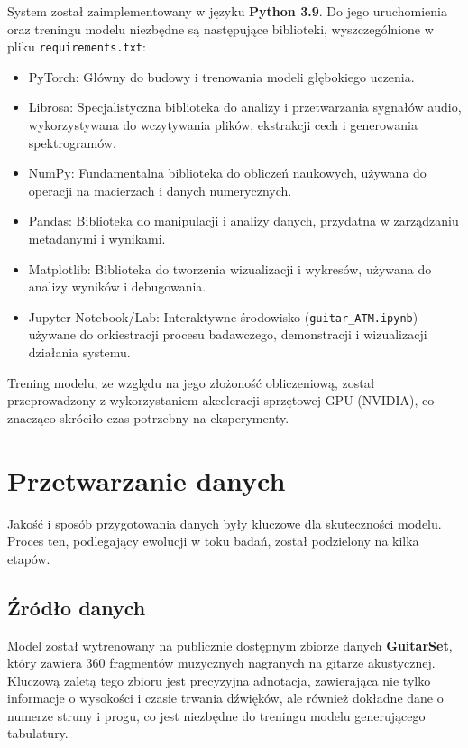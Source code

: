 System został zaimplementowany w języku \textbf{Python 3.9}. Do jego uruchomienia oraz treningu modelu niezbędne są następujące biblioteki, wyszczególnione w pliku \texttt{requirements.txt}:

\begin{itemize}
    \item PyTorch: Główny  do budowy i trenowania modeli głębokiego uczenia.
    \item Librosa: Specjalistyczna biblioteka do analizy i przetwarzania sygnałów audio, wykorzystywana do wczytywania plików, ekstrakcji cech i generowania spektrogramów.
    \item NumPy: Fundamentalna biblioteka do obliczeń naukowych, używana do operacji na macierzach i danych numerycznych.
    \item Pandas: Biblioteka do manipulacji i analizy danych, przydatna w zarządzaniu metadanymi i wynikami.
    \item Matplotlib: Biblioteka do tworzenia wizualizacji i wykresów, używana do analizy wyników i debugowania.
    \item Jupyter Notebook/Lab: Interaktywne środowisko (\texttt{guitar\_ATM.ipynb}) używane do orkiestracji procesu badawczego, demonstracji i wizualizacji działania systemu.
\end{itemize}

Trening modelu, ze względu na jego złożoność obliczeniową, został przeprowadzony z wykorzystaniem akceleracji sprzętowej GPU (NVIDIA), co znacząco skróciło czas potrzebny na eksperymenty.

\section*{Przetwarzanie danych}
\label{sec:tech_dane}

Jakość i sposób przygotowania danych były kluczowe dla skuteczności modelu. Proces ten, podlegający ewolucji w toku badań, został podzielony na kilka etapów.

\subsection*{Źródło danych}

Model został wytrenowany na publicznie dostępnym zbiorze danych \textbf{GuitarSet}, który zawiera 360 fragmentów muzycznych nagranych na gitarze akustycznej. Kluczową zaletą tego zbioru jest precyzyjna adnotacja, zawierająca nie tylko informacje o wysokości i czasie trwania dźwięków, ale również dokładne dane o numerze struny i progu, co jest niezbędne do treningu modelu generującego tabulatury.

